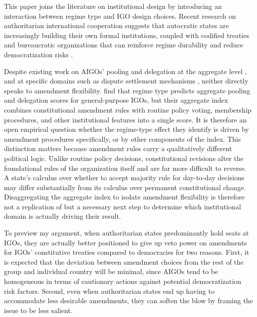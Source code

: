 \documentclass[12pt]{article}
\begin{document}
This paper joins the literature on institutional design by introducing an interaction between regime type and IGO design choices. Recent research on authoritarian international cooperation suggests that autocratic states are increasingly building their own formal institutions, coupled with codified treaties and bureaucratic organizations that can reinforce regime durability and reduce democratization risks \parencite{debre_are_2025, debre_clubs_2022, cottiero_illiberal_2025, obydenkova_authoritarian_2019, ginsburg_authoritarian_2020}. 

Despite existing work on AIGOs' pooling and delegation at the aggregate level
\parencite{tallberg_democracy_2025}, and at specific domains such as dispute settlement
mechanisms \parencite{bae_regime-type_2025}, neither directly speaks to amendment
flexibility. \textcite{tallberg_democracy_2025} find that regime type predicts aggregate
pooling and delegation scores for general-purpose IGOs, but their aggregate index combines
constitutional amendment rules with routine policy voting, membership procedures, and
other institutional features into a single score. It is therefore an open empirical
question whether the regime-type effect they identify is driven by amendment procedures
specifically, or by other components of the index. This distinction matters because
amendment rules carry a qualitatively different political logic. Unlike routine policy
decisions, constitutional revisions alter the foundational rules of the organization
itself and are far more difficult to reverse. A state's calculus over whether to accept
majority rule for day-to-day decisions may differ substantially from its calculus over
permanent constitutional change. Disaggregating the aggregate index to isolate amendment
flexibility is therefore not a replication of \textcite{tallberg_democracy_2025} but a necessary next step to determine which institutional domain is actually driving their
result.

To preview my argument, when authoritarian states predominantly hold seats at IGOs, they are actually better positioned to give up veto power on amendments for IGOs' constitutive treaties compared to democracies for two reasons. First, it is expected that the deviation between amendment choices from the rest of the group and individual country will be minimal, since AIGOs tend to be homogeneous in terms of cautionary actions against potential democratization risk factors. Second, even when authoritarian states end up having to accommodate less desirable amendments, they can soften the blow by framing the issue to be less salient.
\end{document}
